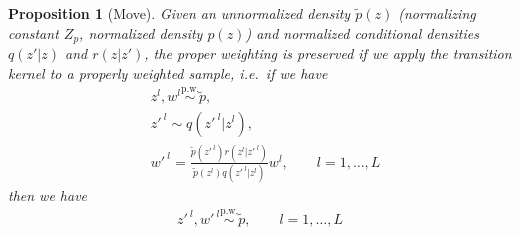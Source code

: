 \documentclass{article}
\newtheorem{proposition}{Proposition}
\theoremstyle{definition}
\newcommand{\given}{\lvert}
\newcommand{\pw}{\overset{\text{p.w.}}{\sim}
}
\begin{document}
\begin{proposition}[Move]
\label{proposition:extendedspace}
    Given an unnormalized density $\tilde p(z)$ (normalizing constant $Z_p$, normalized density $p(z)$) and normalized conditional densities $q(z' \given z)$ and $r(z \given z')$, the proper weighting is preserved if we apply the transition kernel to a properly weighted sample, i.e.~if we have
    \begin{align}
        &
        z^l, w^l \pw \tilde p, \label{eq:pw-of-p}\\[1em]
        &
         z'^{\:l} \sim q(z'^{\:l} \given z^l),  \label{eq:z-prime}\\[1em]
        &
        w'^{\:l} = \frac{\tilde p(z'^{\:l})r(z^l \given z'^{\:l})}{\tilde p(z^l)q(z'^{\:l} \given z^l)} w^l, \qquad l = 1, \ldots, L \label{eq:w-prime}
    \end{align}
then we have
    \begin{align}
        z'^{\:l}, w'^{\:l} \pw \tilde p, \qquad  l = 1, \ldots, L \label{eq:to-prove}
    \end{align}
\end{proposition}
\end{document}
